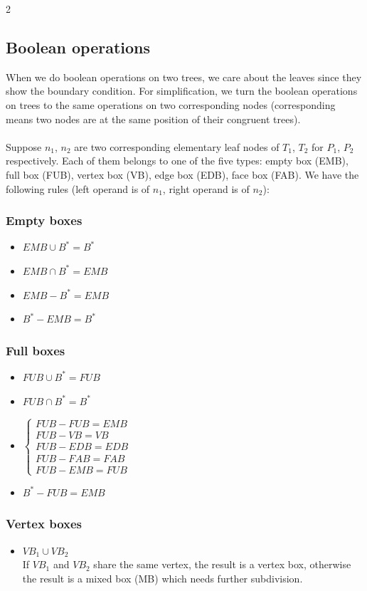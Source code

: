 \documentclass[twoside]{article}
\begin{document}
\begin{multicols}{2}
\subsection {Boolean operations}
When we do boolean operations on two trees, we care about the leaves since they show the boundary condition. For simplification, we turn the boolean operations on trees to the same operations on two corresponding nodes (corresponding means two nodes are at the same position of their congruent trees).
\\
\\
\indent
Suppose $n_1$, $n_2$ are two corresponding elementary leaf nodes of $T_1$, $T_2$ for $P_1$, $P_2$ respectively. Each of them belongs to one of the five types: empty box (EMB), full box (FUB), vertex box (VB), edge box (EDB), face box (FAB). We have the following rules (left operand is of $n_1$, right operand is of $n_2$):

\subsubsection{Empty boxes}
\begin{itemize}
\item $EMB \cup B^* = B^*$
\item $EMB \cap B^* = EMB$
\item $EMB - B^* = EMB$
\item $B^* - EMB = B^*$
\end{itemize}

\subsubsection{Full boxes}
\begin{itemize}
\item $FUB \cup B^* = FUB$
\item $FUB \cap B^* = B^*$
\item $\left\{
\begin{array}{l}
FUB - FUB = EMB\\
FUB - VB = VB\\
FUB - EDB = EDB\\
FUB - FAB = FAB\\
FUB - EMB = FUB
\end{array}
\right.$
\item $B^* - FUB = EMB$
\end{itemize}

\subsubsection{Vertex boxes}
\begin{itemize}
\item $VB_1 \cup VB_2$
\\
If $VB_1$ and $VB_2$ share the same vertex, the result is a vertex box, otherwise the result is a mixed box (MB) which needs further subdivision.


\end{itemize}
\end{multicols}
\end{document}
